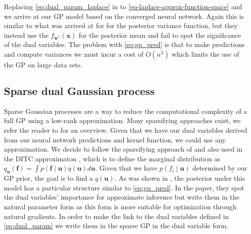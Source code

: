 \documentclass{article}
\newcommand{\mbf}[1]{\mathbf{#1}}
\newcommand{\vf}{\mbf{f}}
\newcommand{\vu}{\mbf{u}}
\newcommand{\vx}{\mbf{x}}
\newcommand{\vw}{\mbf{w}}
\begin{document}
Replacing \cref{eq:dual_param_laplace} in to \cref{eq-laplace-approx-function-space} and we arrive at our GP model based on the converged neural network. Again this is similar to what was arrived at for \citet{immerImprovingPredictionsBayesian2021} for the posterior variance function, but they instead use the $f_{\vw^*}(\vx)$ for the posterior mean and fail to spot the significance of the dual variables. The problem with \cref{eq:gp_pred} is that to make predictions and compute variances we must incur a cost of $O(n^3)$ which limits the use of the GP on large data sets.


\subsection{Sparse dual Gaussian process} 
\label{sec:sparse-dual-gp}
%
Sparse Gaussian processes are a way to reduce the computational complexity of a full GP using a low-rank approximation. Many sparsifying approaches exist, we refer the reader to \cite{quinonero2005unifying} for an overview. Given that we have our dual variables derived from our neural network predictions and kernel function, we could use any approximation. We decide to follow the sparsifying approach of \citet{titsias2009variational} and also used in the DITC approximaton \cite{quinonero2005unifying}, which is to define the marginal distribution as $q_{\vu}(\vf)  = \int p(\vf  \mid \vu) q(\vu)  d\vu$. Given that we have $p(f_i  \mid \vu)$ determined by our GP prior, the goal is to find a $q(\vu)$. As was shown in \cite{adam2021dual}, the posterior under this model has a particular structure similar to \cref{eq:gp_pred}. In the paper, they spot the dual variables' importance for approximate inference but write them in the natural parameter form as this form is more suitable for optimization through natural gradients. In order to make the link to the dual variables defined in \cref{eq:dual_param} we write them in the sparse GP in the dual variable form. 
\end{document}
